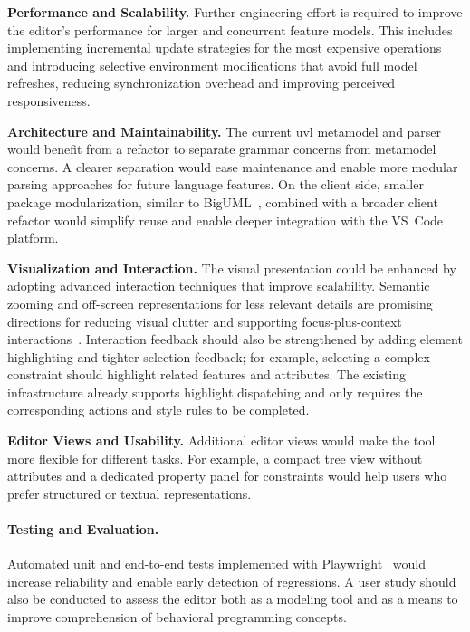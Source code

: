 \textbf{Performance and Scalability.}
Further engineering effort is required to improve the editor's performance for larger and concurrent feature models.
This includes implementing incremental update strategies for the most expensive operations and introducing selective environment modifications that avoid full model refreshes, reducing synchronization overhead and improving perceived responsiveness.

\textbf{Architecture and Maintainability.}
The current \gls{uvl} metamodel and parser would benefit from a refactor to separate grammar concerns from metamodel concerns.
A clearer separation would ease maintenance and enable more modular parsing approaches for future language features.
On the client side, smaller package modularization, similar to BigUML~\cite{metin_developing_2023}, combined with a broader client refactor would simplify reuse and enable deeper integration with the VS~Code platform.

\textbf{Visualization and Interaction.}
The visual presentation could be enhanced by adopting advanced interaction techniques that improve scalability.
Semantic zooming and off-screen representations for less relevant details are promising directions for reducing visual clutter and supporting focus-plus-context interactions~\cite{de_carlo_advanced_2022}.
Interaction feedback should also be strengthened by adding element highlighting and tighter selection feedback; for example, selecting a complex constraint should highlight related features and attributes.
The existing infrastructure already supports highlight dispatching and only requires the corresponding actions and style rules to be completed.

\textbf{Editor Views and Usability.}
Additional editor views would make the tool more flexible for different tasks.
For example, a compact tree view without attributes and a dedicated property panel for constraints would help users who prefer structured or textual representations.

\paragraph{Testing and Evaluation.}
Automated unit and end-to-end tests implemented with Playwright~\cite{noauthor_eclipse-glspglsp-playwright_2026} would increase reliability and enable early detection of regressions.
A user study should also be conducted to assess the editor both as a modeling tool and as a means to improve comprehension of behavioral programming concepts.